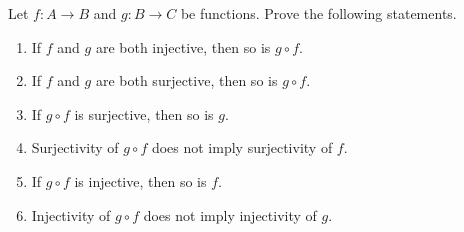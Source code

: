 \documentclass[12pt,letterpaper,boxed]{hmcpset}
\begin{document}
\begin{problem}[Exercise 3.4.]
Let $f: A \rightarrow B$ and $g : B \rightarrow C$ be functions. Prove the following statements.
\vspace{-2mm}
\begin{enumerate}
	\itemsep0em
	\item If $f$ and $g$ are both injective, then so is $g \circ f.$
	\item If $f$ and $g$ are both surjective, then so is $g \circ f.$
	\item If $g \circ f$ is surjective, then so is $g$.
	\item Surjectivity of $g \circ f$ does not imply surjectivity of $f$.
	\item If $g \circ f$ is injective, then so is $f$.
	\item Injectivity of $g \circ f$ does not imply injectivity of $g$.
\end{enumerate}
\end{problem}
\end{document}
